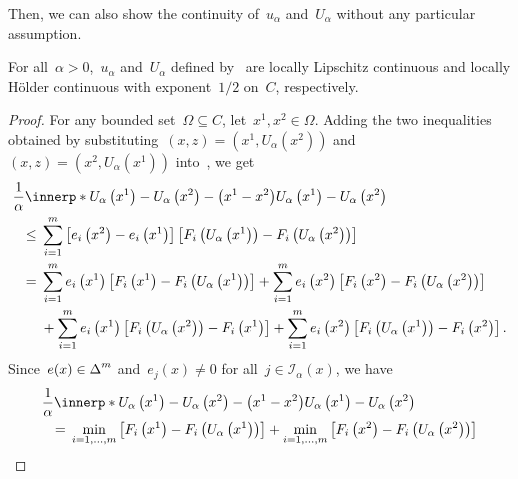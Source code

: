 \documentclass[../../main]{subfiles}
\begin{document}
Then, we can also show the continuity of~$u_\alpha$ and~$U_\alpha$ without any particular assumption.
\begin{theorem} 
    For all~$\alpha > 0$,~$u_\alpha$ and~$U_\alpha$ defined by~ are locally Lipschitz continuous and locally H\"older continuous with exponent~$1 / 2$ on~$C$, respectively.
\end{theorem}
\begin{proof}
    For any bounded set~$\Omega \subseteq C$, let~$x^1, x^2 \in \Omega$.
    Adding the two inequalities obtained by substituting~$(x, z) = (x^1, U_\alpha\left(x^2\right))$ and~$(x, z) = (x^2, U_\alpha\left(x^1\right))$ into~, we get
    \begin{align}
        \MoveEqLeft \frac{1}{\alpha} \innerp*{U_\alpha\left(x^1\right) - U_\alpha\left(x^2\right) - \left(x^1 - x^2\right)}{U_\alpha\left(x^1\right) - U_\alpha\left(x^2\right)}                                                                          \\
        \le{} & \sum_{i = 1}^{m} \left[e_i\left(x^2\right) - e_i\left(x^1\right)\right] \left[ F_i\left(U_\alpha\left(x^1\right)\right) - F_i\left(U_\alpha\left(x^2\right)\right) \right]                                                                \\
        ={}   & \sum_{i = 1}^{m} e_i\left(x^1\right) \left[ F_i\left(x^1\right) - F_i\left(U_\alpha\left(x^1\right)\right) \right] + \sum_{i = 1}^{m} e_i\left(x^2\right) \left[ F_i\left(x^2\right) - F_i\left(U_\alpha\left(x^2\right)\right) \right]   \\
              & + \sum_{i = 1}^{m} e_i\left(x^1\right) \left[ F_i\left(U_\alpha\left(x^2\right)\right) - F_i\left(x^1\right) \right] + \sum_{i = 1}^{m} e_i\left(x^2\right) \left[ F_i\left(U_\alpha\left(x^1\right)\right) - F_i\left(x^2\right) \right]
        .\end{align}
    Since~$e(x) \in \operatorname{\Delta}^m$ and~$e_j(x) \neq 0$ for all~$j \in \mathscr{I}_\alpha(x)$, we have
    \begin{align}
        \MoveEqLeft \frac{1}{\alpha} \innerp*{U_\alpha\left(x^1\right) - U_\alpha\left(x^2\right) - \left(x^1 - x^2\right)}{U_\alpha\left(x^1\right) - U_\alpha\left(x^2\right)}                                                                        \\
        ={} & \min_{i = 1, \dots, m} \left[ F_i\left(x^1\right) - F_i\left(U_\alpha\left(x^1\right)\right) \right] + \min_{i = 1, \dots, m} \left[ F_i\left(x^2\right) - F_i\left(U_\alpha\left(x^2\right)\right) \right]                               \\

\end{align}
\end{proof}
\end{document}
